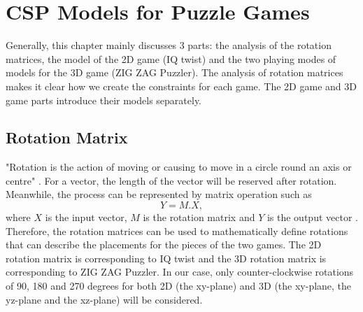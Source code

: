 \chapter{CSP Models for Puzzle Games}
\label{cha:design}
Generally, this chapter mainly discusses 3 parts: the analysis of the rotation matrices, the model of the 2D game (IQ twist) and the two playing modes of models for the 3D game (ZIG ZAG Puzzler). The analysis of rotation matrices makes it clear how we create the constraints for each game. The 2D game and 3D game parts introduce their models separately.
\section{Rotation Matrix}
"Rotation is the action of moving or causing to move in a circle round an axis or centre" \cite{r14}. For a vector, the length of the vector will be reserved after rotation. Meanwhile, the process can be represented by matrix operation such as 
\begin{equation}
Y=M.X,
\end{equation}
where $X$ is the input vector, $M$ is the rotation matrix and $Y$ is the output vector \cite{r15}. Therefore, the rotation matrices can be used to mathematically define rotations that can describe the placements for the pieces of the two games. The 2D rotation matrix is corresponding to IQ twist and the 3D rotation matrix is corresponding to ZIG ZAG Puzzler. In our case, only counter-clockwise rotations of 90, 180 and 270 degrees for both 2D (the xy-plane) and 3D (the xy-plane, the yz-plane and the xz-plane) will be considered.
